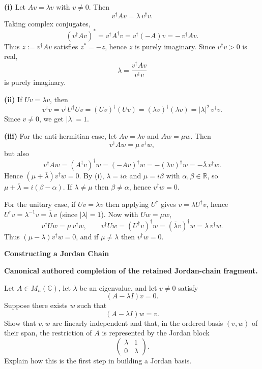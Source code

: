 \begin{solution}
\textbf{(i)} Let $Av=\lambda v$ with $v\neq 0$. Then
\[
v^\dagger Av=\lambda\, v^\dagger v.
\]
Taking complex conjugates,
\[
(v^\dagger Av)^* = v^\dagger A^\dagger v = v^\dagger(-A)v = -\,v^\dagger Av.
\]
Thus $z:=v^\dagger Av$ satisfies $z^*=-z$, hence $z$ is purely imaginary. Since $v^\dagger v>0$ is real,
\[
\lambda=\frac{v^\dagger Av}{v^\dagger v}
\]
is purely imaginary.

\textbf{(ii)} If $Uv=\lambda v$, then
\[
v^\dagger v = v^\dagger U^\dagger U v = (Uv)^\dagger(Uv)
=(\lambda v)^\dagger(\lambda v)=|\lambda|^2\, v^\dagger v.
\]
Since $v\neq 0$, we get $|\lambda|=1$.

\textbf{(iii)} For the anti-hermitian case, let $Av=\lambda v$ and $Aw=\mu w$. Then
\[
v^\dagger Aw=\mu\, v^\dagger w,
\]
but also
\[
v^\dagger Aw=(A^\dagger v)^\dagger w = (-Av)^\dagger w = -(\lambda v)^\dagger w
= -\overline{\lambda}\, v^\dagger w.
\]
Hence $(\mu+\overline{\lambda})v^\dagger w=0$. By (i), $\lambda=i\alpha$ and $\mu=i\beta$ with
$\alpha,\beta\in\mathbb R$, so $\mu+\overline{\lambda}=i(\beta-\alpha)$. If $\lambda\neq \mu$ then
$\beta\neq \alpha$, hence $v^\dagger w=0$.

For the unitary case, if $Uv=\lambda v$ then applying $U^\dagger$ gives
$v=\lambda U^\dagger v$, hence $U^\dagger v=\lambda^{-1}v=\overline{\lambda}\,v$ (since $|\lambda|=1$).
Now with $Uw=\mu w$,
\[
v^\dagger Uw=\mu\, v^\dagger w,
\qquad
v^\dagger Uw=(U^\dagger v)^\dagger w=(\overline{\lambda}v)^\dagger w=\lambda\, v^\dagger w.
\]
Thus $(\mu-\lambda)v^\dagger w=0$, and if $\mu\neq\lambda$ then $v^\dagger w=0$.
\end{solution}

\begin{problem}[CP-I-0079]
\label{prob:cp-i-0079}
\textbf{Constructing a Jordan Chain}

\textbf{Canonical authored completion of the retained Jordan-chain fragment.}

\hspace*{1.5em}Let \(A\in M_n(\mathbb C)\), let \(\lambda\) be an eigenvalue, and let
\(v\neq0\) satisfy
\[
(A-\lambda I)v=0.
\]
Suppose there exists \(w\) such that
\[
(A-\lambda I)w=v.
\]
Show that \(v,w\) are linearly independent and that, in the ordered basis \((v,w)\) of their
span, the restriction of \(A\) is represented by the Jordan block
\[
\begin{pmatrix}
\lambda&1\\
0&\lambda
\end{pmatrix}.
\]
Explain how this is the first step in building a Jordan basis.
\end{problem}

